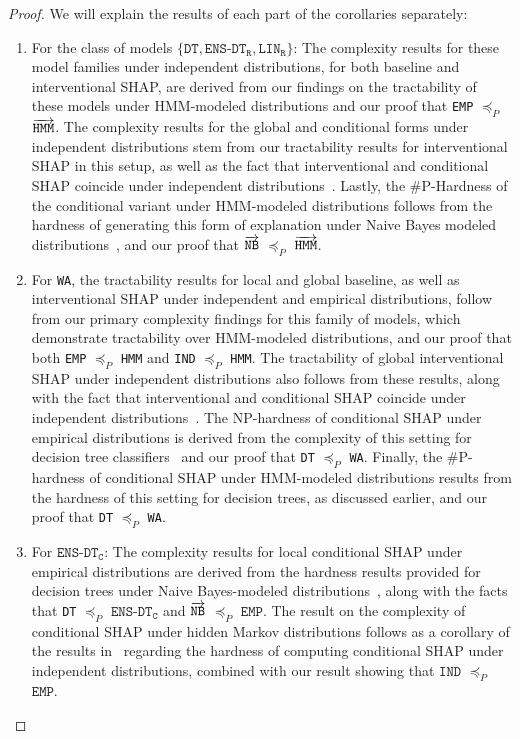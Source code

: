 \begin{proof}

We will explain the results of each part of the corollaries separately: \begin{enumerate}
 \item For the class of models $\{\texttt{DT}, \texttt{ENS-DT}_{\texttt{R}}, \texttt{LIN}_{\texttt{R}}\}$: The complexity results for these model families under independent distributions, for both baseline and interventional SHAP, are derived from our findings on the tractability of these models under HMM-modeled distributions and our proof that \texttt{EMP} $\preceq_{P}$ $\overrightarrow{\texttt{HMM}}$. The complexity results for the global and conditional forms under independent distributions stem from our tractability results for interventional SHAP in this setup, as well as the fact that interventional and conditional SHAP coincide under independent distributions~\citep{sundararajan20b}. Lastly, the $\#$P-Hardness of the conditional variant under HMM-modeled distributions follows from the hardness of generating this form of explanation under Naive Bayes modeled distributions~\citep{vander21}, and our proof that $\overrightarrow{\texttt{NB}}$ $\preceq_{P}$ $\overrightarrow{\texttt{HMM}}$.
\item For \texttt{WA}, the tractability results for local and global baseline, as well as interventional SHAP under independent and empirical distributions, follow from our primary complexity findings for this family of models, which demonstrate tractability over HMM-modeled distributions, and our proof that both \texttt{EMP} $\preceq_{P}$ \texttt{HMM} and \texttt{IND} $\preceq_{P}$ \texttt{HMM}. The tractability of global interventional SHAP under independent distributions also follows from these results, along with the fact that interventional and conditional SHAP coincide under independent distributions~\citep{sundararajan20b}. The NP-hardness of conditional SHAP under empirical distributions is derived from the complexity of this setting for decision tree classifiers~\citep{vander21} and our proof that \texttt{DT} $\preceq_{P}$ \texttt{WA}. Finally, the \#P-hardness of conditional SHAP under HMM-modeled distributions results from the hardness of this setting for decision trees, as discussed earlier, and our proof that \texttt{DT} $\preceq_{P}$ \texttt{WA}.

\item For $\texttt{ENS-DT}_{\texttt{C}}$: The complexity results for local conditional SHAP under empirical distributions are derived from the hardness results provided for decision trees under Naive Bayes-modeled distributions~\citep{vander21}, along with the facts that \texttt{DT} $\preceq_{P}$ $\texttt{ENS-DT}_{\texttt{C}}$ and $\overrightarrow{\texttt{NB}}$ $\preceq_{P}$ $\texttt{EMP}$. The result on the complexity of conditional SHAP under hidden Markov distributions follows as a corollary of the results in~\cite{huangupdates} regarding the hardness of computing conditional SHAP under independent distributions, combined with our result showing that $\texttt{IND}$ $\preceq_{P}$ $\texttt{EMP}$.


\end{enumerate}
\end{proof}
